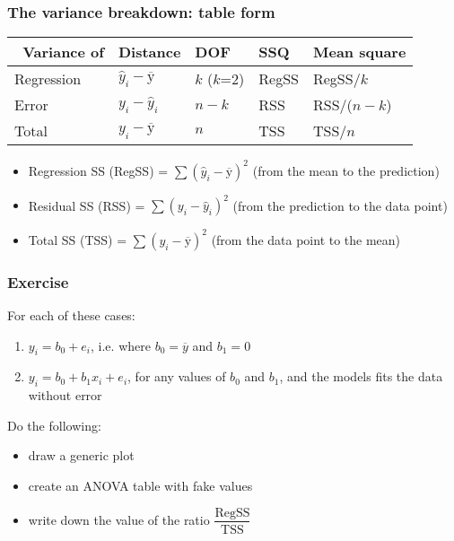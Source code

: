 \begin{frame}\frametitle{The variance breakdown: table form}

	\newpage
	\begin{table}
		[ht] \centering
		\begin{tabular}
			{lllll} \hline\ \textbf{Variance of} & \textbf{Distance} &\textbf{DOF} &\textbf{SSQ} &\textbf{Mean square} \\
			\hline Regression & $\hat{y}_i - \overline{\mathrm{y}}$ & $k$ ($k$=2) & RegSS & RegSS/$k$ \\
			Error & $y_i - \hat{y}_i$ & $n-k$ & RSS & RSS/($n-k$) \\
			\hline \hline Total & $y_i - \overline{\mathrm{y}}$ & $n$ & TSS & TSS/$n$ \\
			\hline
		\end{tabular}
	\end{table}
	\begin{itemize}
		\item	Regression SS (RegSS) = $\sum{(\hat{y}_i - \overline{\mathrm{y}})^2}$ {\small (from the mean to the prediction)}
		\item	Residual SS (RSS) = $\sum{(y_i - \hat{y}_i)^2}$ {\small(from the prediction to the data point)}
		\item	Total SS (TSS) = $\sum{(y_i - \overline{\mathrm{y}})^2}$ {\small(from the data point to the mean)}
	\end{itemize}
\end{frame}

\begin{frame}\frametitle{Exercise}

	For each of these cases:
	\begin{enumerate}
		\item	$y_i = b_0 + e_i$, i.e. where $b_0 = \overline{y}$ and $b_1 = 0$
		\item	$y_i = b_0 + b_1 x_i + e_i$, for any values of $b_0$ and $b_1$, and the models fits the data without error
	\end{enumerate}

	Do the following:
	\begin{itemize}
		\item	draw a generic plot
		\item	create an ANOVA table with fake values
		\item	write down the value of the ratio $\dfrac{\text{RegSS}}{\text{TSS}}$
	\end{itemize}
\end{frame}

